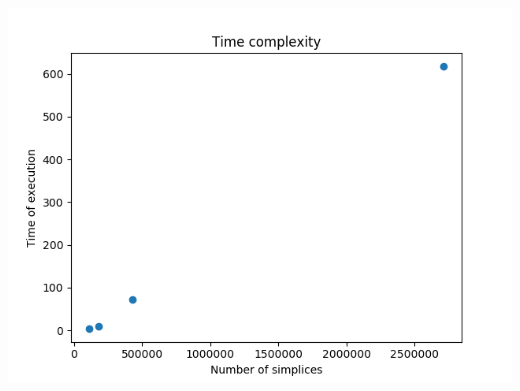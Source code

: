 \documentclass[a4paper,11pt]{article}
\begin{document}
\includegraphics[width=15cm]{"Fig1"}\\

	
\end{document}
